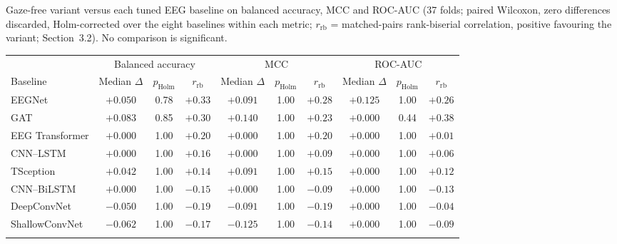 \documentclass[pdflatex,sn-basic,Numbered]{sn-jnl}
\makeatletter
\newenvironment{suptable}{\par\bigskip\noindent\begin{minipage}{\textwidth}\def\@captype{table}\centering\tablebodyfont}{\end{minipage}\par\bigskip}
\makeatother
\begin{document}
\begin{suptable}
\caption{Gaze-free variant versus each tuned EEG baseline on balanced accuracy, MCC and ROC-AUC (37 folds; paired Wilcoxon, zero differences discarded, Holm-corrected over the eight baselines within each metric; $r_{\mathrm{rb}}$ = matched-pairs rank-biserial correlation, positive favouring the variant; Section~3.2). No comparison is significant.}\label{tabS6}
\scriptsize
\setlength{\tabcolsep}{1.5pt}\begin{tabular*}{\linewidth}{@{\extracolsep{\fill}}lccccccccc@{}}
\toprule
& \multicolumn{3}{c}{Balanced accuracy} & \multicolumn{3}{c}{MCC} & \multicolumn{3}{c}{ROC-AUC} \\
Baseline & Median $\Delta$ & $p_{\mathrm{Holm}}$ & $r_{\mathrm{rb}}$ & Median $\Delta$ & $p_{\mathrm{Holm}}$ & $r_{\mathrm{rb}}$ & Median $\Delta$ & $p_{\mathrm{Holm}}$ & $r_{\mathrm{rb}}$ \\
\midrule
EEGNet & $+0.050$ & 0.78 & $+0.33$ & $+0.091$ & 1.00 & $+0.28$ & $+0.125$ & 1.00 & $+0.26$ \\
GAT & $+0.083$ & 0.85 & $+0.30$ & $+0.140$ & 1.00 & $+0.23$ & $+0.000$ & 0.44 & $+0.38$ \\
EEG Transformer & $+0.000$ & 1.00 & $+0.20$ & $+0.000$ & 1.00 & $+0.20$ & $+0.000$ & 1.00 & $+0.01$ \\
CNN--LSTM & $+0.000$ & 1.00 & $+0.16$ & $+0.000$ & 1.00 & $+0.09$ & $+0.000$ & 1.00 & $+0.06$ \\
TSception & $+0.042$ & 1.00 & $+0.14$ & $+0.091$ & 1.00 & $+0.15$ & $+0.000$ & 1.00 & $+0.12$ \\
CNN--BiLSTM & $+0.000$ & 1.00 & $-0.15$ & $+0.000$ & 1.00 & $-0.09$ & $+0.000$ & 1.00 & $-0.13$ \\
DeepConvNet & $-0.050$ & 1.00 & $-0.19$ & $-0.091$ & 1.00 & $-0.19$ & $+0.000$ & 1.00 & $-0.04$ \\
ShallowConvNet & $-0.062$ & 1.00 & $-0.17$ & $-0.125$ & 1.00 & $-0.14$ & $+0.000$ & 1.00 & $-0.09$ \\
\botrule
\end{tabular*}
\end{suptable}
\end{document}
